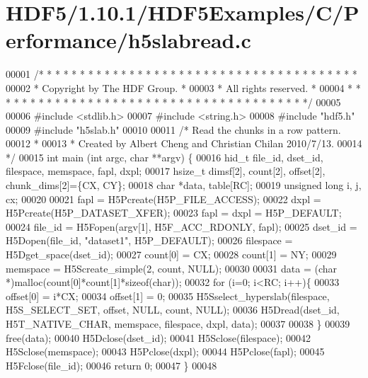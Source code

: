 \hypertarget{_h_d_f5_21_810_81_2_h_d_f5_examples_2_c_2_performance_2h5slabread_8c_source}{}\section{H\+D\+F5/1.10.1/\+H\+D\+F5\+Examples/\+C/\+Performance/h5slabread.c}
\label{_h_d_f5_21_810_81_2_h_d_f5_examples_2_c_2_performance_2h5slabread_8c_source}

\begin{DoxyCode}
00001 \textcolor{comment}{/* * * * * * * * * * * * * * * * * * * * * * * * * * * * * * * * * * * * * * *}
00002 \textcolor{comment}{ * Copyright by The HDF Group.                                               *}
00003 \textcolor{comment}{ * All rights reserved.                                                      *}
00004 \textcolor{comment}{ * * * * * * * * * * * * * * * * * * * * * * * * * * * * * * * * * * * * * * */}
00005 
00006 \textcolor{preprocessor}{#include <stdlib.h>}
00007 \textcolor{preprocessor}{#include <string.h>}
00008 \textcolor{preprocessor}{#include "hdf5.h"}
00009 \textcolor{preprocessor}{#include "h5slab.h"}
00010 
00011 \textcolor{comment}{/* Read the chunks in a row pattern.}
00012 \textcolor{comment}{ *}
00013 \textcolor{comment}{ * Created by Albert Cheng and Christian Chilan 2010/7/13.}
00014 \textcolor{comment}{ */}
00015 \textcolor{keywordtype}{int} main (\textcolor{keywordtype}{int} argc, \textcolor{keywordtype}{char} **argv) \{
00016     hid\_t   file\_id, dset\_id, filespace, memspace, fapl, dxpl;
00017     hsize\_t dimsf[2], count[2], offset[2], chunk\_dims[2]=\{CX, CY\};
00018     \textcolor{keywordtype}{char}    *data, table[RC];               
00019     \textcolor{keywordtype}{unsigned} \textcolor{keywordtype}{long} i, j, cx;
00020 
00021     fapl = H5Pcreate(H5P\_FILE\_ACCESS);
00022     dxpl = H5Pcreate(H5P\_DATASET\_XFER);
00023     fapl = dxpl = H5P\_DEFAULT;
00024     file\_id = H5Fopen(argv[1], H5F\_ACC\_RDONLY, fapl);
00025     dset\_id = H5Dopen(file\_id, \textcolor{stringliteral}{"dataset1"}, H5P\_DEFAULT);
00026     filespace = H5Dget\_space(dset\_id); 
00027     count[0] = CX;
00028     count[1] = NY;
00029     memspace = H5Screate\_simple(2, count, NULL);
00030 
00031     data = (\textcolor{keywordtype}{char} *)malloc(count[0]*count[1]*\textcolor{keyword}{sizeof}(\textcolor{keywordtype}{char}));
00032     \textcolor{keywordflow}{for} (i=0; i<RC; i++)\{
00033         offset[0] = i*CX;
00034         offset[1] = 0;
00035         H5Sselect\_hyperslab(filespace, H5S\_SELECT\_SET, offset, NULL, count, NULL);
00036         H5Dread(dset\_id, H5T\_NATIVE\_CHAR, memspace, filespace, dxpl, data);
00037     
00038     \}
00039     free(data);
00040     H5Dclose(dset\_id);
00041     H5Sclose(filespace);
00042     H5Sclose(memspace);
00043     H5Pclose(dxpl);
00044     H5Pclose(fapl);
00045     H5Fclose(file\_id);
00046     \textcolor{keywordflow}{return} 0;
00047 \}     
00048 
\end{DoxyCode}
